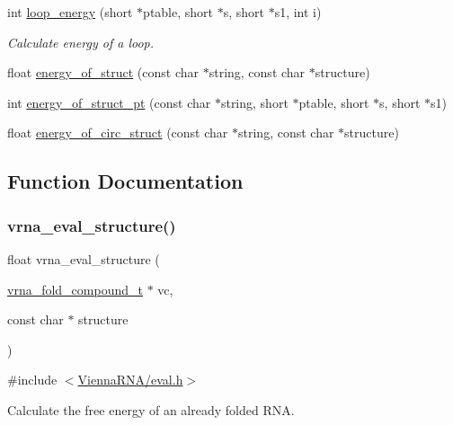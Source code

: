 \begin{DoxyCompactItemize}
int \hyperlink{group__eval_ga507d4fd93f4b398d793ba2402731388d}{loop\+\_\+energy} (short $\ast$ptable, short $\ast$s, short $\ast$s1, int i)
\begin{DoxyCompactList}\small\item\em Calculate energy of a loop. \end{DoxyCompactList}\item 
float \hyperlink{group__eval_gac2b37fea2145c94d925a3f33378ef87b}{energy\+\_\+of\+\_\+struct} (const char $\ast$string, const char $\ast$structure)
\item 
int \hyperlink{group__eval_ga27ce6f68512d43bf1fe14a06c9d76d5c}{energy\+\_\+of\+\_\+struct\+\_\+pt} (const char $\ast$string, short $\ast$ptable, short $\ast$s, short $\ast$s1)
\item 
float \hyperlink{group__eval_ga657222e2758c46bf13b416ef3032e417}{energy\+\_\+of\+\_\+circ\+\_\+struct} (const char $\ast$string, const char $\ast$structure)
\end{DoxyCompactItemize}


\subsection{Function Documentation}
\mbox{\label{group__eval_ga58f199f1438d794a265f3b27fc8ea631}} 
\subsubsection{\texorpdfstring{vrna\+\_\+eval\+\_\+structure()}{vrna\_eval\_structure()}}
{\footnotesize\ttfamily float vrna\+\_\+eval\+\_\+structure (\begin{DoxyParamCaption}\item[{\hyperlink{group__fold__compound_ga1b0cef17fd40466cef5968eaeeff6166}{vrna\+\_\+fold\+\_\+compound\+\_\+t} $\ast$}]{vc,  }\item[{const char $\ast$}]{structure }\end{DoxyParamCaption})}



{\ttfamily \#include $<$\hyperlink{eval_8h}{Vienna\+R\+N\+A/eval.\+h}$>$}



Calculate the free energy of an already folded R\+NA. 

